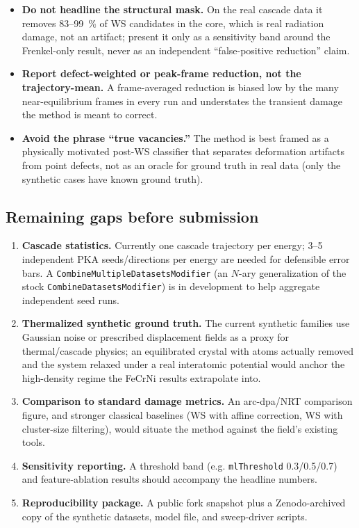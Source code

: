 \documentclass[11pt]{article}
\newcommand{\code}[1]{\texttt{#1}}
\begin{document}
\begin{itemize}[nosep]
    \item \textbf{Do not headline the structural mask.} On the real cascade data it removes
    83--\SI{99}{\percent} of WS candidates in the core, which is real radiation damage, not
    an artifact; present it only as a sensitivity band around the Frenkel-only result, never as an
    independent ``false-positive reduction'' claim.
    \item \textbf{Report defect-weighted or peak-frame reduction, not the trajectory-mean.} A
    frame-averaged reduction is biased low by the many near-equilibrium frames in every run and
    understates the transient damage the method is meant to correct.
    \item \textbf{Avoid the phrase ``true vacancies.''} The method is best framed as a physically
    motivated post-WS classifier that separates deformation artifacts from point defects, not as
    an oracle for ground truth in real data (only the synthetic cases have known ground truth).
\end{itemize}

\subsection{Remaining gaps before submission}

\begin{enumerate}[nosep]
    \item \textbf{Cascade statistics.} Currently one cascade trajectory per energy; 3--5
    independent PKA seeds/directions per energy are needed for defensible error bars. A
    \code{CombineMultipleDatasetsModifier} (an $N$-ary generalization of the stock
    \code{CombineDatasetsModifier}) is in development to help aggregate independent seed runs.
    \item \textbf{Thermalized synthetic ground truth.} The current synthetic families use Gaussian
    noise or prescribed displacement fields as a proxy for thermal/cascade physics; an equilibrated
    crystal with atoms actually removed and the system relaxed under a real interatomic potential
    would anchor the high-density regime the FeCrNi results extrapolate into.
    \item \textbf{Comparison to standard damage metrics.} An arc-dpa/NRT comparison figure, and
    stronger classical baselines (WS with affine correction, WS with cluster-size filtering),
    would situate the method against the field's existing tools.
    \item \textbf{Sensitivity reporting.} A threshold band (e.g. \code{mlThreshold} 0.3/0.5/0.7)
    and feature-ablation results should accompany the headline numbers.
    \item \textbf{Reproducibility package.} A public fork snapshot plus a Zenodo-archived copy of
    the synthetic datasets, model file, and sweep-driver scripts.
\end{enumerate}
\end{document}
